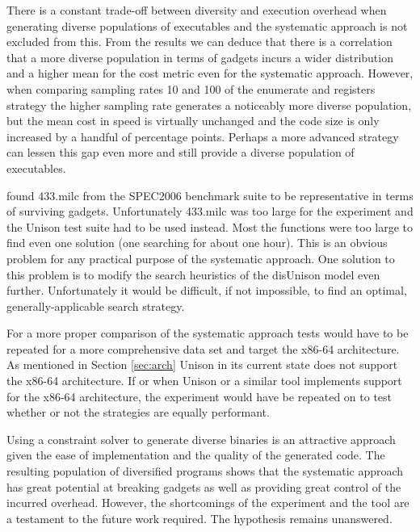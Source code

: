 There is a constant trade-off between diversity and execution overhead when generating
diverse populations of executables and the systematic approach is not excluded from this.
From the results we can deduce that there is a correlation that a more diverse population
in terms of gadgets incurs a wider distribution and a higher mean for the cost metric even
for the systematic approach. However, when comparing sampling rates 10 and 100 of the
enumerate and registers strategy the higher sampling rate generates a noticeably more
diverse population, but the mean cost in speed is virtually unchanged and the code size is
only increased by a handful of percentage points. Perhaps a more advanced strategy can
lessen this gap even more and still provide a diverse population of executables.

\textcite{large-scale-automated} found 433.milc from the SPEC2006 benchmark suite to be
representative in terms of surviving gadgets. Unfortunately 433.milc was too large for the
experiment and the Unison test suite had to be used instead. Most the functions were too
large to find even one solution (one searching for about one hour). This is an obvious
problem for any practical purpose of the systematic approach. One solution to this problem
is to modify the search heuristics of the disUnison model even further. Unfortunately it
would be difficult, if not impossible, to find an optimal, generally-applicable search
strategy.

For a more proper comparison of the systematic approach tests would have to be repeated for
a more comprehensive data set and target the x86-64 architecture. As mentioned in Section
\ref{sec:arch} Unison in its current state does not support the x86-64 architecture. If or
when Unison or a similar tool implements support for the x86-64 architecture, the
experiment would have be repeated on to test whether or not the strategies are equally
performant.

Using a constraint solver to generate diverse binaries is an attractive approach given
the ease of implementation and the quality of the generated code. The resulting population
of diversified programs shows that the systematic approach has great potential at breaking
gadgets as well as providing great control of the incurred overhead. However, the
shortcomings of the experiment and the tool are a testament to the future work required.
The hypothesis remains unanswered.
